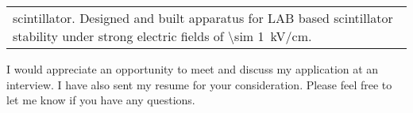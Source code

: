 \documentclass[11pt]{moderncv}        %
\begin{document}
\begin{tabularx}{\linewidth}{@{{}\textbullet\enskip}X@{\quad}@{}}
	scintillator. Designed and built apparatus for LAB based scintillator
	stability under strong electric fields of \SI{\sim 1}{kV/cm}.\\
\end{tabularx}

I would appreciate an opportunity to meet and discuss my application at an
interview. I have also sent my resume for your consideration. Please feel free
to let me know if you have any questions.

\makeletterclosing
\end{document}
